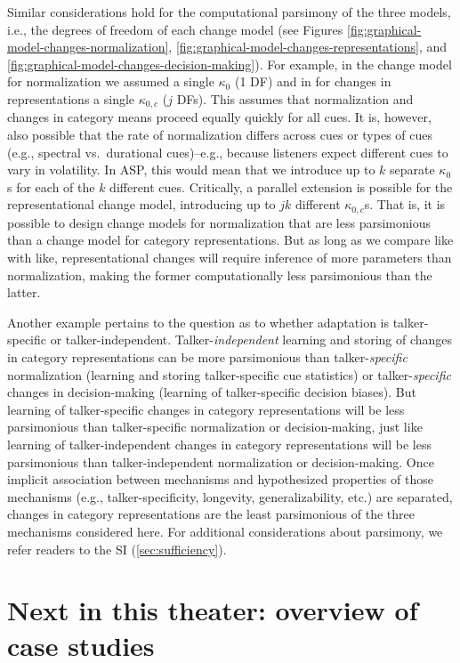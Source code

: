 \documentclass[
  11pt,
  man,floatsintext]{apa6}
\begin{document}
Similar considerations hold for the computational parsimony of the three models, i.e., the degrees of freedom of each change model (see Figures \ref{fig:graphical-model-changes-normalization}, \ref{fig:graphical-model-changes-representations}, and \ref{fig:graphical-model-changes-decision-making}). For example, in the change model for normalization we assumed a single \(\kappa_0\) (1 DF) and in for changes in representations a single \(\kappa_{0,c}\) (\(j\) DFs). This assumes that normalization and changes in category means proceed equally quickly for all cues. It is, however, also possible that the rate of normalization differs across cues or types of cues (e.g., spectral vs.~durational cues)--e.g., because listeners expect different cues to vary in volatility. In ASP, this would mean that we introduce up to \(k\) separate \(\kappa_{0}\)s for each of the \(k\) different cues. Critically, a parallel extension is possible for the representational change model, introducing up to \(jk\) different \(\kappa_{0,c}\)s. That is, it is possible to design change models for normalization that are less parsimonious than a change model for category representations. But as long as we compare like with like, representational changes will require inference of more parameters than normalization, making the former computationally less parsimonious than the latter.

Another example pertains to the question as to whether adaptation is talker-specific or talker-independent. Talker-\emph{independent} learning and storing of changes in category representations can be more parsimonious than talker-\emph{specific} normalization (learning and storing talker-specific cue statistics) or talker-\emph{specific} changes in decision-making (learning of talker-specific decision biases). But learning of talker-specific changes in category representations will be less parsimonious than talker-specific normalization or decision-making, just like learning of talker-independent changes in category representations will be less parsimonious than talker-independent normalization or decision-making. Once implicit association between mechanisms and hypothesized properties of those mechanisms (e.g., talker-specificity, longevity, generalizability, etc.) are separated, changes in category representations are the least parsimonious of the three mechanisms considered here. For additional considerations about parsimony, we refer readers to the SI (\ref{sec:sufficiency}).

\hypertarget{next-in-this-theater-overview-of-case-studies}{%
\section{Next in this theater: overview of case studies}\label{next-in-this-theater-overview-of-case-studies}}
\end{document}

